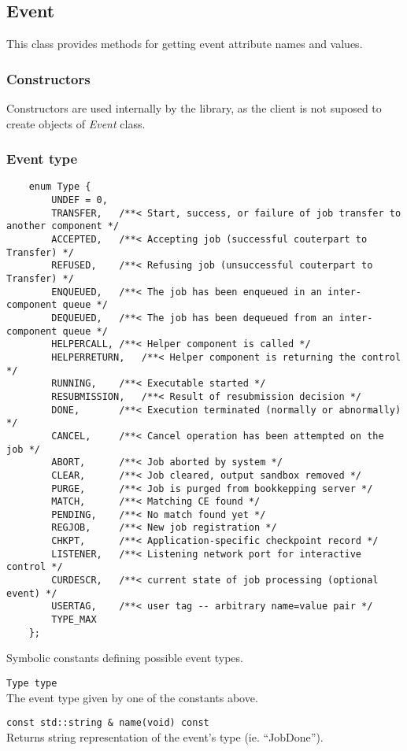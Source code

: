 \documentclass{egee}
\begin{document}
\subsection*{Event}
This class provides methods for getting event attribute names and
values.

\subsubsection*{Constructors}
Constructors are used internally by the library, as the client is not
suposed to create objects of \emph{Event} class.

\subsubsection*{Event type}
\begin{description}
\item{

\begin{verbatim}
	enum Type {
		UNDEF = 0,
		TRANSFER,	/**< Start, success, or failure of job transfer to another component */
		ACCEPTED,	/**< Accepting job (successful couterpart to Transfer) */
		REFUSED,	/**< Refusing job (unsuccessful couterpart to Transfer) */
		ENQUEUED,	/**< The job has been enqueued in an inter-component queue */
		DEQUEUED,	/**< The job has been dequeued from an inter-component queue */
		HELPERCALL,	/**< Helper component is called */
		HELPERRETURN,	/**< Helper component is returning the control */
		RUNNING,	/**< Executable started */
		RESUBMISSION,	/**< Result of resubmission decision */
		DONE,		/**< Execution terminated (normally or abnormally) */
		CANCEL,		/**< Cancel operation has been attempted on the job */
		ABORT,		/**< Job aborted by system */
		CLEAR,		/**< Job cleared, output sandbox removed */
		PURGE,		/**< Job is purged from bookkepping server */
		MATCH,		/**< Matching CE found */
		PENDING,	/**< No match found yet */
		REGJOB,		/**< New job registration */
		CHKPT,		/**< Application-specific checkpoint record */
		LISTENER,	/**< Listening network port for interactive control */
		CURDESCR,	/**< current state of job processing (optional event) */
		USERTAG,	/**< user tag -- arbitrary name=value pair */
		TYPE_MAX
	};
\end{verbatim}
}
Symbolic constants defining possible event types.

\item{\verb|Type type|}\\
The event type given by one of the constants above.

\item{\verb|const std::string & name(void) const|}\\
Returns string representation of the event's type (ie. ``JobDone'').

\end{description}
\end{document}
